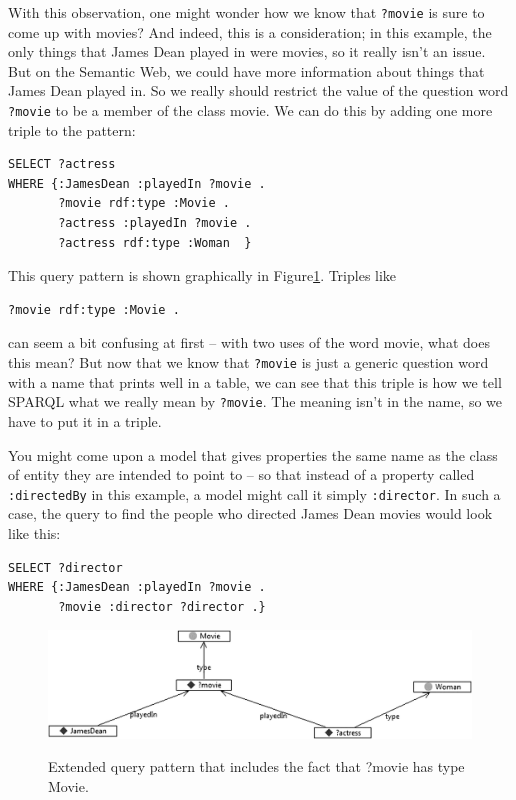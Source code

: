 With this observation, one might wonder how we know that \texttt{?movie} is sure
to come up with movies? And indeed, this is a consideration; in this
example, the only things that James Dean played in were movies, so it
really isn't an issue. But on the Semantic Web, we could have more
information about things that James Dean played in. So we really should
restrict the value of the question word \texttt{?movie} to be a member of the
class movie. We can do this by adding one more triple to the pattern:


\begin{lstlisting}
SELECT ?actress
WHERE {:JamesDean :playedIn ?movie .
       ?movie rdf:type :Movie .
       ?actress :playedIn ?movie .
       ?actress rdf:type :Woman  }
\end{lstlisting}

This query pattern is shown graphically in Figure\ref{fig:ch6.5}. Triples like

\begin{lstlisting}
?movie rdf:type :Movie .
\end{lstlisting}

can seem a bit confusing at first -- with two uses of the word movie,
what does this mean? But now that we know that \texttt{?movie} is just a generic
question word with a name that prints well in a table, we can see that
this triple is how we tell SPARQL what we really mean by \texttt{?movie}. The
meaning isn't in the name, so we have to put it in a triple.

You might come upon a model that gives properties the same name as the
class of entity they are intended to point to -- so that instead of a
property called \texttt{:directedBy} in this example, a model might call it
simply \texttt{:director}. In such a case, the query to find the people who
directed James Dean movies would look like this:

\begin{lstlisting}
SELECT ?director
WHERE {:JamesDean :playedIn ?movie .
       ?movie :director ?director .}
\end{lstlisting}

\begin{figure}
\centering
\includegraphics[width=5in]{media/ch6/f06-05.png}
\label{fig:ch6.5}
\caption{Extended query pattern that includes the fact that ?movie has type Movie.
}
\end{figure}

